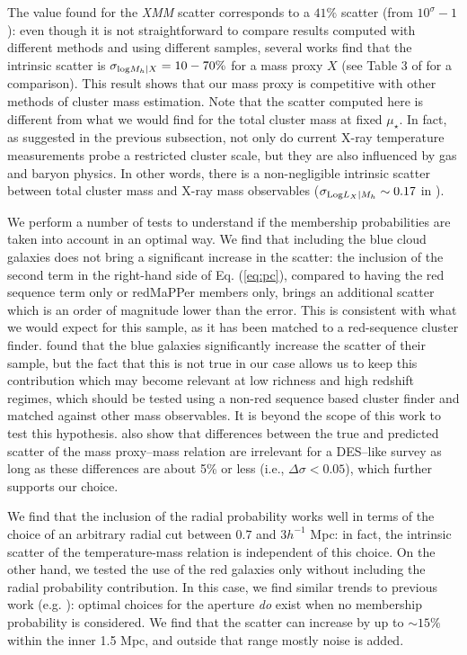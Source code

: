 The value found for the \emph{XMM} scatter corresponds to a $41\%$ scatter (from $10^{\sigma}-1$): even though it is not straightforward to compare results computed with different methods and using different samples, several works find that the intrinsic scatter is $\sigma_{{\rm log} M_h|X} = 10-70\%$ for a mass proxy $X$ (see Table 3 of \citealt{mulroy} for a comparison). This result shows that our mass proxy is competitive with other methods of cluster mass estimation. Note that the scatter computed here is different from what we would find for the total cluster mass at fixed $\mu_\star$. In fact, as suggested in the previous subsection, not only do current X-ray temperature measurements probe a restricted cluster scale, but they are also influenced by gas and baryon physics. In other words, there is a non-negligible intrinsic scatter between total cluster mass and X-ray mass observables ($\sigma_{{\rm Log} L_X|M_h} \sim 0.17$ in \citealt{vikhlinin}).

We perform a number of tests to understand if the membership probabilities are taken into account in an optimal way. We find that including the blue cloud galaxies does not bring a significant increase in the scatter: the inclusion of the second term in the right-hand side of Eq. (\ref{eq:pc}), compared to having the red sequence term only or redMaPPer members only, brings an additional scatter which is an order of magnitude lower than the error. This is consistent with what we would expect for this sample, as it has been matched to a red-sequence cluster finder. \citet{extrinsicscatter} found that the blue galaxies significantly increase the scatter of their sample, but the fact that this is not true in our case allows us to keep this contribution which may become relevant at low richness and high redshift regimes, which should be tested using a non-red sequence based cluster finder and matched against other mass observables. It is beyond the scope of this work to test this hypothesis. \citet{extrinsicscatter} also show that differences between the true and predicted scatter of the mass proxy--mass relation are irrelevant for a DES--like survey as long as these differences are about 5\% or less (i.e., $\Delta \sigma < 0.05$), which further supports our choice.%

We find that the inclusion of the radial probability  works well in terms of the choice of an arbitrary radial cut between $0.7$ and $3 h^{-1}$ Mpc: in fact, the intrinsic scatter of the temperature-mass relation is independent of this choice. On the other hand, we tested the use of the red galaxies only without including the radial probability contribution. In this case, we find similar trends to previous work (e.g. \citealt{andreon}): optimal choices for the aperture {\em do} exist when no membership probability is considered. We find that the scatter can increase by up to $\sim 15\%$ within the inner 1.5 Mpc, and outside that range mostly noise is added.

